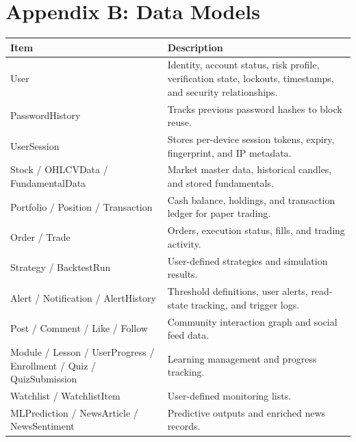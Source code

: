 \documentclass[11pt,a4paper]{article}
\begin{document}
\section*{Appendix B: Data Models}
\begin{longtable}{p{} p{}}
\textbf{Item} & \textbf{Description} \\ \hline
User & Identity, account status, risk profile, verification state, lockouts, timestamps, and security relationships. \\
PasswordHistory & Tracks previous password hashes to block reuse. \\
UserSession & Stores per-device session tokens, expiry, fingerprint, and IP metadata. \\
Stock / OHLCVData / FundamentalData & Market master data, historical candles, and stored fundamentals. \\
Portfolio / Position / Transaction & Cash balance, holdings, and transaction ledger for paper trading. \\
Order / Trade & Orders, execution status, fills, and trading activity. \\
Strategy / BacktestRun & User-defined strategies and simulation results. \\
Alert / Notification / AlertHistory & Threshold definitions, user alerts, read-state tracking, and trigger logs. \\
Post / Comment / Like / Follow & Community interaction graph and social feed data. \\
Module / Lesson / UserProgress / Enrollment / Quiz / QuizSubmission & Learning management and progress tracking. \\
Watchlist / WatchlistItem & User-defined monitoring lists. \\
MLPrediction / NewsArticle / NewsSentiment & Predictive outputs and enriched news records. \\
\end{longtable}
\end{document}
